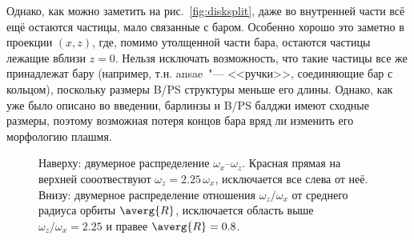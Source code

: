 \documentclass[tikz]{trlnotes}
\begin{document}
Однако, как можно заметить на рис.~\ref{fig:disksplit}, даже во внутренней части всё ещё остаются частицы, мало
связанные с баром. Особенно хорошо это заметно в проекции $(x, z)$, где, помимо утолщенной части бара, остаются
частицы лежащие вблизи $z=0$. Нельзя исключать возможность, что такие частицы все же принадлежат бару (например, т.н.
ansae~"--- <<ручки>>, соединяющие бар с кольцом), поскольку размеры B/PS структуры меньше его длины. Однако, как
уже было описано во введении, барлинзы и B/PS балджи имеют сходные размеры, поэтому возможная потеря концов бара
вряд ли изменить его морфологию плашмя. 


\begin{figure}[htpb]
  \centering
  \caption{Наверху: двумерное распределение $ω_x$--$ω_z$. Красная прямая на верхней сооотвествуют $ω_z = 2.25\,
    ω_x$, исключается все слева от неё. Внизу: двумерное распределение отношения $ω_z/ω_x$ от среднего радиуса
  орбиты $\averg{R}$, исключается область выше $ω_z/ω_x = 2.25$ и правее $\averg{R} = 0.8$.}
  \label{fig:innerrefine}
\end{figure}
\end{document}
